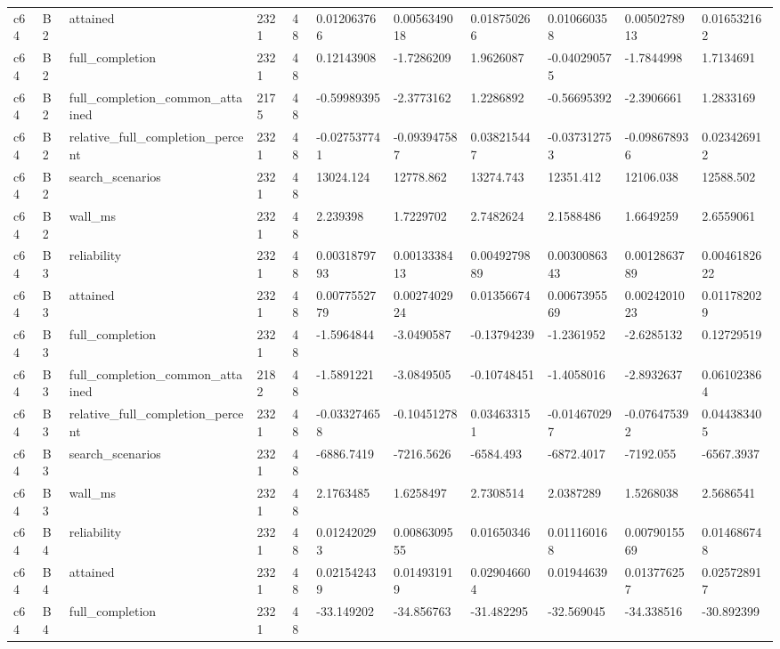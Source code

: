 \begin{longtable}{lllllllllll}
c64 & B2 & attained & 2321 & 48 & 0.012063766 & 0.0056349018 & 0.018750266 & 0.010660358 & 0.0050278913 & 0.016532162 \\
c64 & B2 & full\_completion & 2321 & 48 & 0.12143908 & -1.7286209 & 1.9626087 & -0.040290575 & -1.7844998 & 1.7134691 \\
c64 & B2 & full\_completion\_common\_attained & 2175 & 48 & -0.59989395 & -2.3773162 & 1.2286892 & -0.56695392 & -2.3906661 & 1.2833169 \\
c64 & B2 & relative\_full\_completion\_percent & 2321 & 48 & -0.027537741 & -0.093947587 & 0.038215447 & -0.037312753 & -0.098678936 & 0.023426912 \\
c64 & B2 & search\_scenarios & 2321 & 48 & 13024.124 & 12778.862 & 13274.743 & 12351.412 & 12106.038 & 12588.502 \\
c64 & B2 & wall\_ms & 2321 & 48 & 2.239398 & 1.7229702 & 2.7482624 & 2.1588486 & 1.6649259 & 2.6559061 \\
c64 & B3 & reliability & 2321 & 48 & 0.0031879793 & 0.0013338413 & 0.0049279889 & 0.0030086343 & 0.0012863789 & 0.0046182622 \\
c64 & B3 & attained & 2321 & 48 & 0.0077552779 & 0.0027402924 & 0.01356674 & 0.0067395569 & 0.0024201023 & 0.011782029 \\
c64 & B3 & full\_completion & 2321 & 48 & -1.5964844 & -3.0490587 & -0.13794239 & -1.2361952 & -2.6285132 & 0.12729519 \\
c64 & B3 & full\_completion\_common\_attained & 2182 & 48 & -1.5891221 & -3.0849505 & -0.10748451 & -1.4058016 & -2.8932637 & 0.061023864 \\
c64 & B3 & relative\_full\_completion\_percent & 2321 & 48 & -0.033274658 & -0.10451278 & 0.034633151 & -0.014670297 & -0.076475392 & 0.044383405 \\
c64 & B3 & search\_scenarios & 2321 & 48 & -6886.7419 & -7216.5626 & -6584.493 & -6872.4017 & -7192.055 & -6567.3937 \\
c64 & B3 & wall\_ms & 2321 & 48 & 2.1763485 & 1.6258497 & 2.7308514 & 2.0387289 & 1.5268038 & 2.5686541 \\
c64 & B4 & reliability & 2321 & 48 & 0.012420293 & 0.0086309555 & 0.01650346 & 0.011160168 & 0.0079015569 & 0.014686748 \\
c64 & B4 & attained & 2321 & 48 & 0.021542439 & 0.014931919 & 0.029046604 & 0.01944639 & 0.013776257 & 0.025728917 \\
c64 & B4 & full\_completion & 2321 & 48 & -33.149202 & -34.856763 & -31.482295 & -32.569045 & -34.338516 & -30.892399 \\

\end{longtable}
